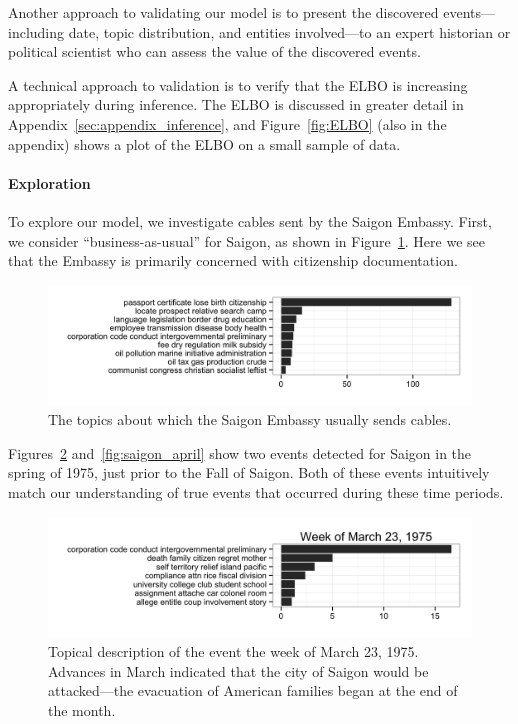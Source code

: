 Another approach to validating our model is to present the discovered events---including date, topic distribution, and entities involved---to an expert historian or political scientist who can assess the value of the discovered events.

A technical approach to validation is to verify that the ELBO is increasing appropriately during inference.  The ELBO is discussed in greater detail in Appendix~\ref{sec:appendix_inference}, and Figure~\ref{fig:ELBO} (also in the appendix) shows a plot of the ELBO on a small sample of data.

\paragraph{Exploration} To explore our model, we investigate cables sent by the Saigon Embassy.  First, we consider ``business-as-usual'' for Saigon, as shown in Figure~\ref{fig:saigon_entity}.  Here we see that the Embassy is primarily concerned with citizenship documentation.

\begin{figure}[ht]
\centering
\includegraphics[width=\textwidth]{fig/saigon_topics.png}
\caption{The topics about which the Saigon Embassy usually sends cables.}
\label{fig:saigon_entity}
\end{figure}

Figures~\ref{fig:saigon_march} and~\ref{fig:saigon_april} show two events detected for Saigon in the spring of 1975, just prior to the Fall of Saigon.  Both of these events intuitively match our understanding of true events that occurred during these time periods.

\begin{figure}[ht]
\centering
\includegraphics[width=\textwidth]{fig/saigon_march23.png}
\caption{Topical description of the event the week of March 23, 1975.  Advances in March indicated that the city of Saigon would be attacked---the evacuation of American families began at the end of the month.}
\label{fig:saigon_march}
\end{figure}

